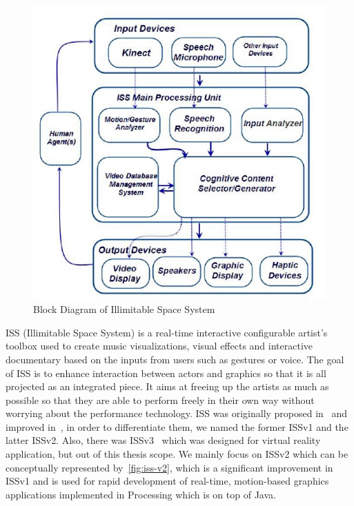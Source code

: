 \begin{figure}
    \begin{center}
        \includegraphics[scale=0.6]{figures/iss_v2_model.png}
    \end{center}
    \caption{Block Diagram of Illimitable Space System}
    \label{fig:iss-v2}
\end{figure}

ISS (Illimitable Space System) is a real-time interactive configurable
artist's toolbox used to create music visualizations, visual effects and
interactive documentary based on the inputs from users such as gestures or
voice.
The goal of ISS is to enhance interaction between actors and graphics so that
it is all projected as an integrated piece. It aims at freeing up the artists
as much as possible so that they are able to perform freely in their own way
without worrying about the performance technology.
ISS was originally proposed in~\cite{first-proposed-iss} and improved 
in~\cite{iss-v2-design-theory-journal}, in order to differentiate them, we named
the former ISSv1 and the latter ISSv2. Also, there was 
ISSv3~\cite{iss-v3-appy-hour-gem2015, iss-v3-appy-hour-siggraph2015} which
was designed for virtual reality application, but out of this thesis scope. We
mainly focus on ISSv2 which can be conceptually represented by~\autoref{fig:iss-v2}, 
which is a significant improvement in ISSv1 and is used
for rapid development of real-time, motion-based graphics applications
implemented in Processing which is on top of Java.

